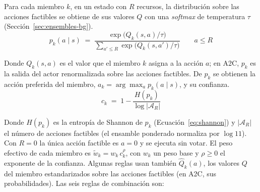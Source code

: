\documentclass[../00_Main/Main.tex]{subfiles}
\begin{document}
Para cada miembro $k$, en un estado con $R$ recursos, la
distribuci\'on sobre las acciones factibles se obtiene de sus valores $Q$
con una \emph{softmax} de temperatura $\tau$
(Secci\'on~\ref{sec:ensembles-bg}).
\begin{equation}
p_k(a \mid s) \;=\;
\frac{\exp\bigl(Q_k(s,a)/\tau\bigr)}
     {\sum_{a' \le R} \exp\bigl(Q_k(s,a')/\tau\bigr)}
\qquad a \le R
\label{eq:ens-softmax}
\end{equation}

Donde $Q_k(s,a)$ es el valor que el miembro $k$ asigna a la acci\'on $a$;
en A2C, $p_k$ es la salida del actor renormalizada sobre las acciones
factibles. De $p_k$ se obtienen la acci\'on preferida del
miembro, $a_k = \arg\max_a p_k(a \mid s)$, y su confianza.
\begin{equation}
c_k \;=\; 1 - \frac{H(p_k)}{\log |\mathcal{A}_R|}
\label{eq:shannon-norm}
\end{equation}

Donde $H(p_k)$ es la entrop\'ia de Shannon de $p_k$
(Ecuaci\'on~\eqref{eq:shannon}) y $|\mathcal{A}_R|$ el n\'umero de
acciones factibles (el ensamble ponderado normaliza por $\log 11$). Con
$R = 0$ la \'unica acci\'on factible es $a = 0$ y se ejecuta sin
votar. El peso efectivo de cada miembro es
$\tilde w_k = w_k\, c_k^{\rho}$, con $w_k$ un peso base y $\rho \ge 0$ el
exponente de la confianza. Algunas reglas usan tambi\'en $\hat Q_k(a)$, los valores $Q$
del miembro estandarizados sobre las acciones factibles (en A2C, sus
probabilidades). Las seis reglas de combinaci\'on son:
\end{document}
